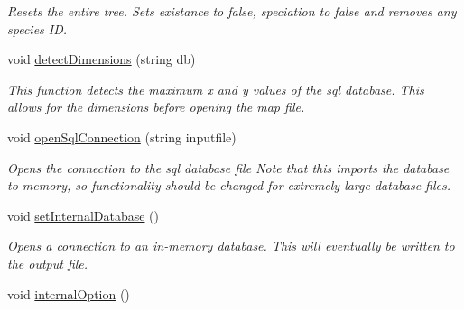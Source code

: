 \begin{DoxyCompactItemize}
\begin{DoxyCompactList}\small\item\em Resets the entire tree. Sets existance to false, speciation to false and removes any species ID. \end{DoxyCompactList}\item 
void \hyperlink{class_community_a579c5f423fc2461838a80baf6b396310}{detect\+Dimensions} (string db)
\begin{DoxyCompactList}\small\item\em This function detects the maximum x and y values of the sql database. This allows for the dimensions before opening the map file. \end{DoxyCompactList}\item 
void \hyperlink{class_community_a389c35f39ed73eb1e5dc1476c220c140}{open\+Sql\+Connection} (string inputfile)
\begin{DoxyCompactList}\small\item\em Opens the connection to the sql database file Note that this imports the database to memory, so functionality should be changed for extremely large database files. \end{DoxyCompactList}\item 
void \hyperlink{class_community_acba6b894e62ad4ecccbcf86f064ebc46}{set\+Internal\+Database} ()\hypertarget{class_community_acba6b894e62ad4ecccbcf86f064ebc46}{}\label{class_community_acba6b894e62ad4ecccbcf86f064ebc46}

\begin{DoxyCompactList}\small\item\em Opens a connection to an in-\/memory database. This will eventually be written to the output file. \end{DoxyCompactList}\item 
void \hyperlink{class_community_a527f03120e4cb211e466cab7e405ba9a}{internal\+Option} ()\hypertarget{class_community_a527f03120e4cb211e466cab7e405ba9a}{}\label{class_community_a527f03120e4cb211e466cab7e405ba9a}


\end{DoxyCompactItemize}
